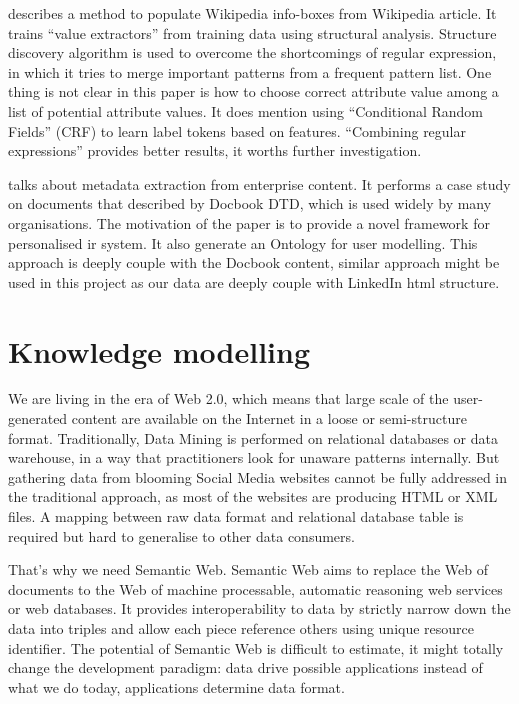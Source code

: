 \cite{lange2010} describes a method to populate Wikipedia info-boxes from Wikipedia article. It trains ``value extractors'' from training data using structural analysis. Structure discovery algorithm is used to overcome the shortcomings of regular expression, in which it tries to merge important patterns from a frequent pattern list. One thing is not clear in this paper is how to choose correct attribute value among a list of potential attribute values. It does mention using ``Conditional Random Fields'' (CRF) to learn label tokens based on features. ``Combining regular expressions'' provides better results, it worths further investigation.


\cite{sah2010} talks about metadata extraction from enterprise content. It performs a case study on documents that described by Docbook DTD, which is used widely by many organisations. The motivation of the paper is to provide a novel framework for personalised \gls{ir} system. It also generate an Ontology for user modelling. This approach is deeply couple with the Docbook content, similar approach might be used in this project as our data are deeply couple with LinkedIn html structure.


\section{Knowledge modelling}

We are living in the era of Web 2.0, which means that large scale of the user-generated content are available on the Internet in a loose or semi-structure format.  Traditionally, Data Mining is performed on relational databases or data warehouse, in a way that practitioners look for unaware patterns internally.  But gathering data from blooming Social Media websites cannot be fully addressed in the traditional approach, as most of the websites are producing HTML or XML files. A mapping between raw data format and relational database table is required but hard to generalise to other data consumers.  

That's why we need Semantic Web. Semantic Web aims to replace the Web of documents to the Web of machine processable, automatic reasoning web services or web databases. It provides interoperability to data by strictly narrow down the data into triples and allow each piece reference others using unique resource identifier. The potential of Semantic Web is difficult to estimate, it might totally change the development paradigm\cite{bergman2009advantages}: data drive possible applications instead of what we do today, applications determine data format.

